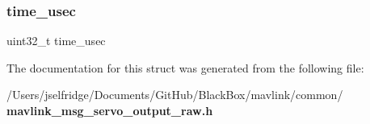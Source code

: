 \mbox{\label{struct____mavlink__servo__output__raw__t_a8cd660097ca5b0fb404b676a0d9c535d}} 
\subsubsection{time\+\_\+usec}
{\footnotesize\ttfamily uint32\+\_\+t time\+\_\+usec}



The documentation for this struct was generated from the following file\+:\begin{DoxyCompactItemize}
\item 
/\+Users/jselfridge/\+Documents/\+Git\+Hub/\+Black\+Box/mavlink/common/\textbf{ mavlink\+\_\+msg\+\_\+servo\+\_\+output\+\_\+raw.\+h}\end{DoxyCompactItemize}
